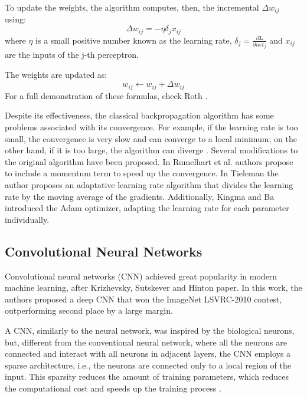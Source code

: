 To update the weights, the algorithm computes, then, the incremental $\Delta w_{ij}$ using:
\begin{equation}
    \Delta w_{ij} = -\eta \delta_j x_{ij}
\end{equation}
where $\eta$ is a small positive number known as the learning rate, $\delta_j = \frac{\partial \mathbf{L}}{\partial net_j}$ and $x_{ij}$ are the inputs of the j-th perceptron. 

The weights are updated as:
\begin{equation}
    w_{ij} \xleftarrow{} w_{ij} + \Delta w_{ij}
\end{equation}
For a full demonstration of these formulas, check Roth \cite{Roth_2016}. 

Despite its effectiveness, the classical backpropagation algorithm has some problems associated with its convergence. For example, if the learning rate is too small, the convergence is very slow and can converge to a local minimum; on the other hand, if it is too large, the algorithm can diverge \cite{ruder2016overview}. Several modifications to the original algorithm have been proposed. In Rumelhart et al. \cite{Rumelhart_Hinton_Williams_1986} authors propose to include a momentum term to speed up the convergence. In Tieleman \cite{1370017282431050757} the author proposes an adaptative learning rate algorithm that divides the learning rate by the moving average of the gradients. Additionally, Kingma and Ba \cite{kingma2017adammethodstochasticoptimization} introduced the Adam optimizer, adapting the learning rate for each parameter individually.

\subsection{Convolutional Neural Networks} \label{section-CNN}
Convolutional neural networks (CNN) achieved great popularity in modern machine learning, after Krizhevsky, Sutskever and Hinton \cite{NIPS2012_c399862d} paper. In this work, the authors proposed a deep CNN that won the ImageNet LSVRC-2010 contest, outperforming second place by a large margin. 

A CNN, similarly to the neural network, was inspired by the biological neurons, but, different from the conventional neural network, where all the neurons are connected and interact with all neurons in adjacent layers, the CNN employs a sparse architecture, i.e., the neurons are connected only to a local region of the input. This sparsity reduces the amount of training parameters, which reduces the computational cost and speeds up the training process \cite{Alzubaidi_Zhang_Humaidi_Al_Dujaili_Duan_Al_Shamma_Santamaria_Fadhel_Al_Amidie_Farhan_2021, 9451544}. 

